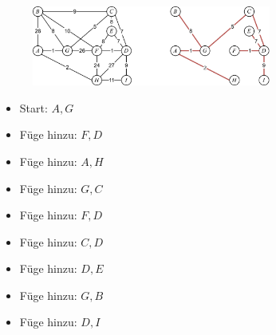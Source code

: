 \begin{figure}[h]
\centering
\includegraphics[width=0.7\textwidth]{graphics/prim_kruskal.png}
\end{figure}

\begin{itemize}
\item Start: ${A,G}$
\item Füge hinzu: ${F,D}$
\item Füge hinzu: ${A,H}$
\item Füge hinzu: ${G,C}$
\item Füge hinzu: ${F,D}$
\item Füge hinzu: ${C,D}$
\item Füge hinzu: ${D,E}$
\item Füge hinzu: ${G,B}$
\item Füge hinzu: ${D,I}$
\end{itemize}